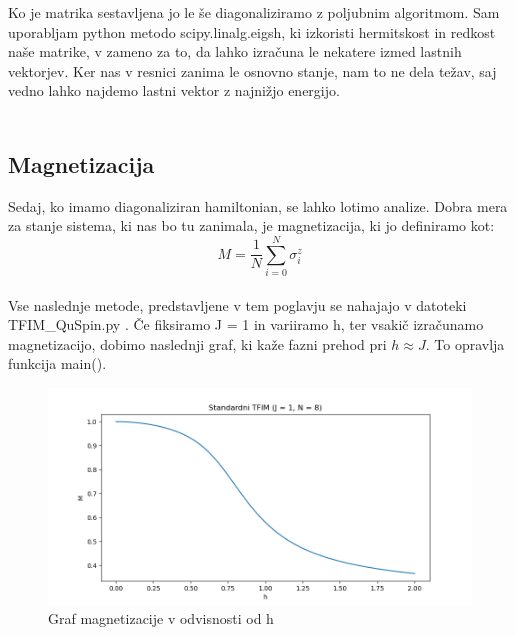\documentclass{article}
\begin{document}
\noindent Ko je matrika sestavljena jo le še diagonaliziramo z poljubnim algoritmom. Sam uporabljam python metodo scipy.linalg.eigsh, ki izkoristi hermitskost in redkost naše matrike, v zameno za to, da lahko izračuna le nekatere izmed lastnih vektorjev. Ker nas v resnici zanima le osnovno stanje, nam to ne dela težav, saj vedno lahko najdemo lastni vektor z najnižjo energijo.\\\\

 
\subsection{Magnetizacija}

\noindent Sedaj, ko imamo diagonaliziran hamiltonian, se lahko lotimo analize. Dobra mera za stanje sistema, ki nas bo tu zanimala, je magnetizacija, ki jo definiramo kot:
\begin{equation}
    M = \frac{1}{N}\sum_{i=0}^N \sigma_i^z
\end{equation}\\
Vse naslednje metode, predstavljene v tem poglavju se nahajajo v datoteki TFIM\_QuSpin.py .
Če fiksiramo J = 1 in variiramo h, ter vsakič izračunamo magnetizacijo, dobimo naslednji graf, ki kaže fazni prehod pri $h \approx J$. To opravlja funkcija main().
\begin{figure}[H]
    \centering
    \includegraphics[width = \linewidth]{STFIM1.png}
    \caption{Graf magnetizacije v odvisnosti od h}
    \label{fig:enter-label}
\end{figure}
\end{document}
